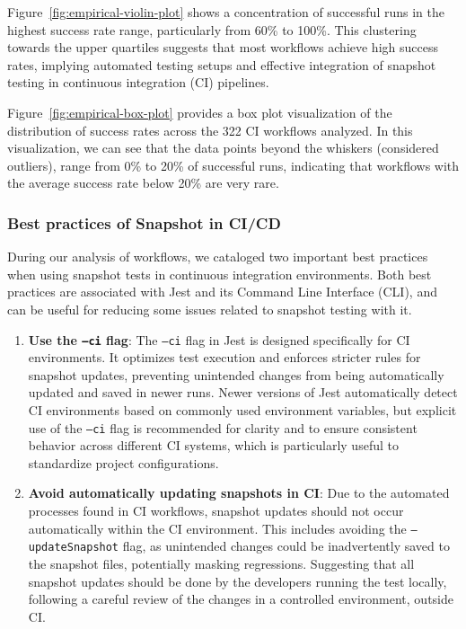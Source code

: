 \documentclass[
	msc, %
	english %
]{../ppgccufmg}
\begin{document}
       Figure~\ref{fig:empirical-violin-plot} shows a concentration of successful runs in the highest success rate range, particularly from 60\% to 100\%. This clustering towards the upper quartiles suggests that most workflows achieve high success rates, implying automated testing setups and effective integration of snapshot testing in continuous integration (CI) pipelines.
        
        Figure~\ref{fig:empirical-box-plot} provides a box plot visualization of the distribution of success rates across the 322 CI workflows analyzed. In this visualization, we can see that the data points beyond the whiskers (considered outliers), range from 0\% to 20\% of successful runs, indicating that workflows with the average success rate below 20\% are very rare.        

        \subsubsection{Best practices of Snapshot in CI/CD}
            
        During our analysis of workflows, we cataloged two important best practices when using snapshot tests in continuous integration environments. Both best practices are associated with Jest and its Command Line Interface (CLI), and can be useful for reducing some issues related to snapshot testing with it.
        
        \begin{enumerate}
            \item \textbf{Use the \texttt{--ci} flag}: The \texttt{--ci} flag in Jest is designed specifically for CI environments. It optimizes test execution and enforces stricter rules for snapshot updates, preventing unintended changes from being automatically updated and saved in newer runs. Newer versions of Jest automatically detect CI environments based on commonly used environment variables, but explicit use of the \texttt{--ci} flag is recommended for clarity and to ensure consistent behavior across different CI systems, which is particularly useful to standardize project configurations.
            \item \textbf{Avoid automatically updating snapshots in CI}: Due to the automated processes found in CI workflows, snapshot updates should not occur automatically within the CI environment. This includes avoiding the \texttt{--updateSnapshot} flag, as unintended changes could be inadvertently saved to the snapshot files, potentially masking regressions. Suggesting that all snapshot updates should be done by the developers running the test locally, following a careful review of the changes in a controlled environment, outside CI.
        \end{enumerate}
\end{document}
